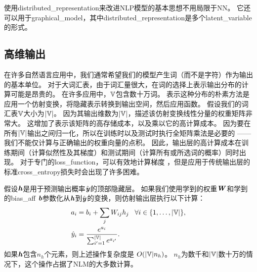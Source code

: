 
使用\gls{distributed_representation}来改进\gls{NLP}模型的基本思想不用局限于\gls{NN}。
它还可以用于\gls{graphical_model}，其中\gls{distributed_representation}是多个\gls{latent_variable}的形式。

\subsection{高维输出}
\label{sec:high_dimensional_outputs}

在许多自然语言应用中，我们通常希望我们的模型产生词（而不是字符）作为输出的基本单位。
对于大词汇表，由于词汇量很大，在词的选择上表示输出分布的计算可能是昂贵的。
在许多应用中，$\mathbb{V}$包含数十万词。
表示这种分布的朴素方法是应用一个仿射变换，将隐藏表示转换到输出空间，然后应用函数。
假设我们的词汇表$\mathbb{V}$大小为$| \mathbb{V} |$。
因为其输出维数为$| \mathbb{V} |$，描述该仿射变换线性分量的权重矩阵非常大。
这增加了表示该矩阵的高存储成本，以及乘以它的高计算成本。
因为要在所有$| \mathbb{V} |$输出之间归一化，所以在训练时以及测试时执行全矩阵乘法是必要的 ——我们不能仅计算与正确输出的权重向量的点积。
因此，输出层的高计算成本在训练期间（计算似然性及其梯度）和测试期间（计算所有或所选词的概率）同时出现。
对于专门的\gls{loss_function}，可以有效地计算梯度 \citep{Vincent2015}，但是应用于传统输出层的标准\gls{cross_entropy}损失时会出现了许多困难。

假设$\boldsymbol{\mathit{h}}$是用于预测输出概率$\hat {\boldsymbol{\mathit{y}}}$的顶部隐藏层。
如果我们使用学到的权重$\boldsymbol{\mathit{W}}$和学到的\gls{bias_aff} $\boldsymbol{\mathit{b}}$参数化从$\boldsymbol{\mathit{h}}$到$\hat {\boldsymbol{\mathit{y}}}$的变换，则仿射输出层执行以下计算：
\begin{align}
\label{eq:softmax-over-words}
  a_i &= b_i + \sum_j  W_{ij} h_j \;\;\; \forall i \in \{1,\ldots,|\mathbb{V}|\}, \\
  \hat{y}_i &= \frac{e^{a_i}}{\sum_{i'=1}^{|\mathbb{V}|} e^{a_{i'}}}.
\end{align}
如果$\boldsymbol{\mathit{h}}$包含$n_h$个元素，则上述操作复杂度是 $O(|\mathbb{V}| n_h)$。
$n_h$为数千和$| \mathbb{V} |$数十万的情况下，这个操作占据了\gls{NLM}的大多数计算。


